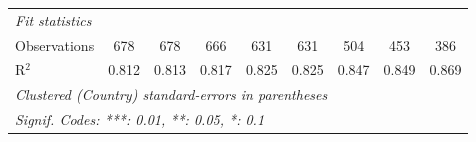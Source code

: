 \begin{tabular}{lcccccccc}
   \midrule \emph{Fit statistics}\\
   Observations                                              & 678          & 678           & 666         & 631           & 631           & 504          & 453     & 386\\  
   R$^2$                                                     & 0.812        & 0.813         & 0.817       & 0.825         & 0.825         & 0.847        & 0.849   & 0.869\\  
   \midrule
   \multicolumn{9}{l}{\emph{Clustered (Country) standard-errors in parentheses}}\\
   \multicolumn{9}{l}{\emph{Signif. Codes: ***: 0.01, **: 0.05, *: 0.1}}\\
\end{tabular}
\par\endgroup


